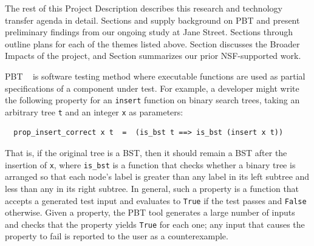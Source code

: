 \medskip

The rest of this Project Description describes this research and
technology transfer agenda in detail.  Sections
 and  supply
background on PBT and present preliminary findings from our
ongoing study at Jane Street.
%
Sections  through
 outline plans for each of the
themes listed above.
Section 
discusses the Broader Impacts of the project, and
Section  summarizes our prior
NSF-supported work.

\iflater{}\fi

\iflater
{}
\fi



%
PBT%
~\cite{hughes2007quickcheck}
is software testing method where
executable functions are used as partial
specifications of a component under test. For example, a developer might
write the following property for an \lstinline{insert}
function on binary search trees, taking an arbitrary tree \texttt{t}
and an integer
\texttt{x} as parameters:
\begin{lstlisting}
  prop_insert_correct x t  =  (is_bst t ==> is_bst (insert x t))
\end{lstlisting}
That is, if the original tree
is a BST, then it should remain
a BST after the insertion of \texttt{x},
where \lstinline{is_bst} is a function that checks whether a binary
tree is arranged so that each node's label is greater
than any label in its left subtree and less than any in its right
subtree.
In general, such a property is a function that
accepts a generated
test input
and evaluates to \lstinline{True} if the test passes and
\lstinline{False} otherwise.
Given a property, the PBT tool generates a
large number of inputs and
checks that the property yields \lstinline{True} for each one; any input
that causes the property to fail is reported to the user as a
{counterexample}.

